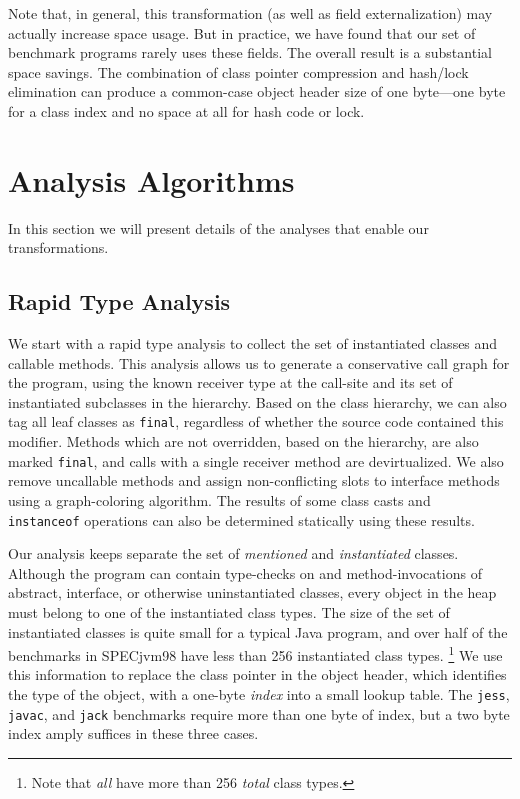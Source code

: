 \documentclass{sig-alt-full}
\begin{document}
Note that, in general, this transformation (as well as field
externalization) may actually increase space usage. But in practice,
we have found that our set of benchmark programs
rarely uses these fields. The overall result is a substantial
space savings. The combination of class pointer compression 
and hash/lock elimination can produce a common-case object header
size of one byte---one byte for a class index and no
space at all for hash code or lock.

\section{Analysis Algorithms}
%
In this section we will present details of the analyses that enable
our transformations.
%
\subsection{Rapid Type Analysis}
We start with a rapid type analysis \cite{bacon96} to collect the set of
instantiated classes and callable methods.  This analysis allows us to generate
a conservative call graph for the program, using the known receiver
type at the call-site and its set of instantiated subclasses in the
hierarchy.  Based on the class hierarchy, we can also tag all leaf
classes as {\tt final}, regardless of whether the source code contained
this modifier.  Methods which are not overridden, based on
the hierarchy, are also marked {\tt final}, and calls with a single
receiver method are devirtualized.  We also remove uncallable methods
and assign non-conflicting slots to interface methods using a
graph-coloring algorithm.  The results of some class casts and {\tt
  instanceof} operations can also be determined statically using
these results.

Our analysis keeps separate the set of {\it mentioned} and
{\it instantiated} classes.
Although the program can contain type-checks on and method-invocations
of abstract, interface, or otherwise uninstantiated classes,
every object
in the heap must belong to one of the instantiated class types.
The size of the set of instantiated classes is quite small for a
typical Java program, and over half of the benchmarks in SPECjvm98
have less than 256 instantiated class types.%
\footnote{Note that \emph{all} have more than 256 \emph{total} class types.}
We use this information
to replace the class pointer in the object header, which
identifies the type of the object, with a one-byte {\it index} into a
small lookup table.  The {\tt jess}, {\tt javac}, and {\tt jack}
benchmarks require more than one byte of index, but a two byte index
amply suffices in these three cases.
%
\end{document}
